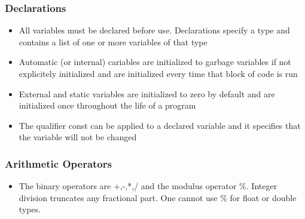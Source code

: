 \subsubsection{Declarations}
\begin{itemize}[--]
	\item All variables must be declared before use. Declarations specify a type and contains a list of one or more variables of that type
	\item Automatic (or internal) cariables are initialized to garbage variables if not explicitely initialized and are initialized every time that block of code is run
	\item External and static variables are initialized to zero by default and are initialized once throughout the life of a program
	\item The qualifier const can be applied to a declared variable and it specifies that the variable will not be changed 
\end{itemize}

\subsubsection{Arithmetic Operators}
\begin{itemize}[--]
	\item The binary operators are +,-,*,/ and the modulus operator \%. Integer division truncates any fractional part. One cannot use \% for float or double types.
\end{itemize}
